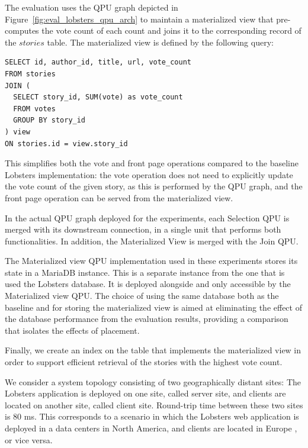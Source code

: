 \bigskip
\noindent
The evaluation uses the QPU graph depicted in Figure~\ref{fig:eval_lobsters_qpu_arch} to maintain a materialized view that
pre-computes the vote count of each count and joins it to the corresponding record of the $stories$ table.
The materialized view is defined by the following query:

\begin{lstlisting}[caption={Definition of the materialized view maintained by the QPU graph shown in Figure~\ref{fig:eval_lobsters_qpu_arch}.}]
SELECT id, author_id, title, url, vote_count
FROM stories
JOIN (
  SELECT story_id, SUM(vote) as vote_count
  FROM votes
  GROUP BY story_id
) view
ON stories.id = view.story_id
\end{lstlisting}

This simplifies both the vote and front page operations compared to the baseline Lobsters implementation:
the vote operation does not need to explicitly update the vote count of the given story, as this
is performed by the QPU graph,
and the front page operation can be served from the materialized view.

In the actual QPU graph deployed for the experiments, each Selection QPU is merged with its downstream connection,
in a single unit that performs both functionalities.
In addition, the Materialized View is merged with the Join QPU.

The Materialized view QPU implementation used in these experiments stores its state in a MariaDB instance.
This is a separate instance from the one that is used the Lobsters database.
It is deployed alongside and only accessible by the Materialized view QPU.
The choice of using the same database both as the baseline and for storing the materialized view is aimed at eliminating
the effect of the database performance from the evaluation results,
providing a comparison that isolates the effects of placement.

Finally, we create an index on the table that implements the materialized view in order to support efficient retrieval of
the stories with the highest vote count.

\bigskip
\noindent
We consider a system topology consisting of two geographically distant sites:
The Lobsters application is deployed on one site, called server site,
and clients are located on another site, called client site.
Round-trip time between these two sites is 80 ms.
This corresponds to a scenario in which the Lobsters web application is deployed in a data centers in North America,
and clients are located in Europe \cite{pbailis:hats}, or vice versa.

